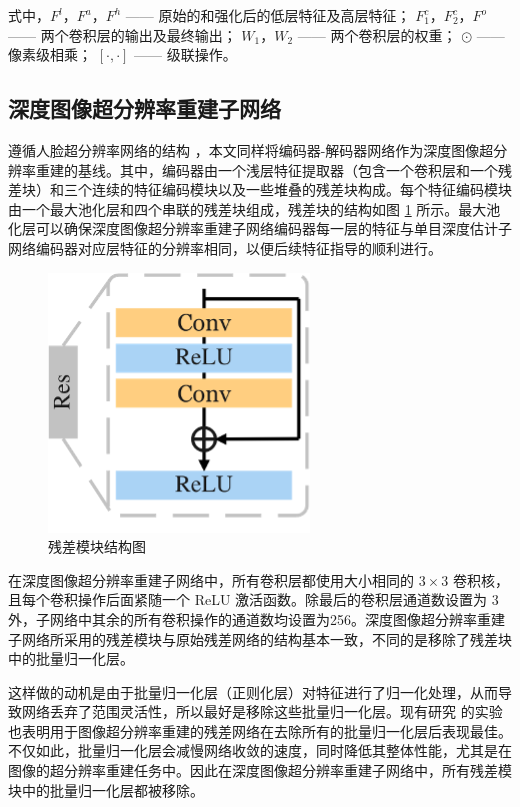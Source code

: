\noindent 式中，$F^l$，$F^a$，$F^h$ —— 原始的和强化后的低层特征及高层特征；\newline
 \indent\quad $F_1^c$，$F_2^c$，$F^o$ —— 两个卷积层的输出及最终输出；\newline
 \indent\quad $W_1$，$W_2$ —— 两个卷积层的权重；\newline
 \indent\quad $\odot$ —— 像素级相乘；\newline
 \indent\quad $[·,·]$ —— 级联操作。
 
 \newpage
 
 \subsection{深度图像超分辨率重建子网络}
 
 遵循人脸超分辨率网络的结构 \cite{DBLP:conf/aaai/YinRZF20}，本文同样将编码器-解码器网络作为深度图像超分辨率重建的基线。其中，编码器由一个浅层特征提取器（包含一个卷积层和一个残差块）和三个连续的特征编码模块以及一些堆叠的残差块构成。每个特征编码模块由一个最大池化层和四个串联的残差块组成，残差块的结构如图 \ref{fig:fig3-3} 所示。最大池化层可以确保深度图像超分辨率重建子网络编码器每一层的特征与单目深度估计子网络编码器对应层特征的分辨率相同，以便后续特征指导的顺利进行。

\begin{figure}[!htbp]
	\centering
	\includegraphics{figures/19.png}
	\caption{残差模块结构图}
	\label{fig:fig3-3}
\end{figure}

在深度图像超分辨率重建子网络中，所有卷积层都使用大小相同的 $3 \times 3$ 卷积核，且每个卷积操作后面紧随一个 ReLU 激活函数。除最后的卷积层通道数设置为 3 外，子网络中其余的所有卷积操作的通道数均设置为256。深度图像超分辨率重建子网络所采用的残差模块与原始残差网络的结构基本一致，不同的是移除了残差块中的批量归一化层。

这样做的动机是由于批量归一化层（正则化层）对特征进行了归一化处理，从而导致网络丢弃了范围灵活性，所以最好是移除这些批量归一化层。现有研究 \cite{DBLP:conf/cvpr/LimSKNL17} 的实验也表明用于图像超分辨率重建的残差网络在去除所有的批量归一化层后表现最佳。不仅如此，批量归一化层会减慢网络收敛的速度，同时降低其整体性能，尤其是在图像的超分辨率重建任务中。因此在深度图像超分辨率重建子网络中，所有残差模块中的批量归一化层都被移除。

